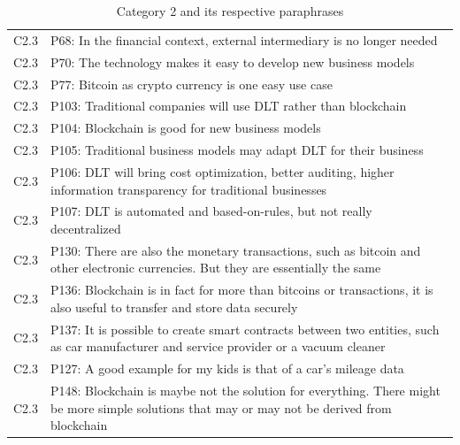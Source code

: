 \begin{table}[H]
\begin{tabularx}{\textwidth}{l|X}
	C2.3 & P68: In the financial context, external intermediary is no longer needed \\  
	C2.3 & P70: The technology makes it easy to develop new business models \\  
	C2.3 & P77: Bitcoin as crypto currency is one easy use case \\  
	C2.3 & P103: Traditional companies will use DLT rather than blockchain \\  
	C2.3 & P104: Blockchain is good for new business models \\  
	C2.3 & P105: Traditional business models may adapt DLT for their business \\  
	C2.3 & P106: DLT will bring cost optimization, better auditing, higher information transparency for traditional businesses \\  
	C2.3 & P107: DLT is automated and based-on-rules, but not really decentralized \\  
	C2.3 & P130: There are also the monetary transactions, such as bitcoin and other electronic currencies. But they are essentially the same \\  
	C2.3 & P136: Blockchain is in fact for more than bitcoins or transactions, it is also useful to transfer and store data securely \\  
	C2.3 & P137: It is possible to create smart contracts between two entities, such as car manufacturer and service provider or a vacuum cleaner \\  
	C2.3 & P127: A good example for my kids is that of a car's mileage data \\  
	C2.3 & P148: Blockchain is maybe not the solution for everything. There might be more simple solutions that may or may not be derived from blockchain \\  
    \end{tabularx}
\caption{Category 2 and its respective paraphrases}
\end{table}

